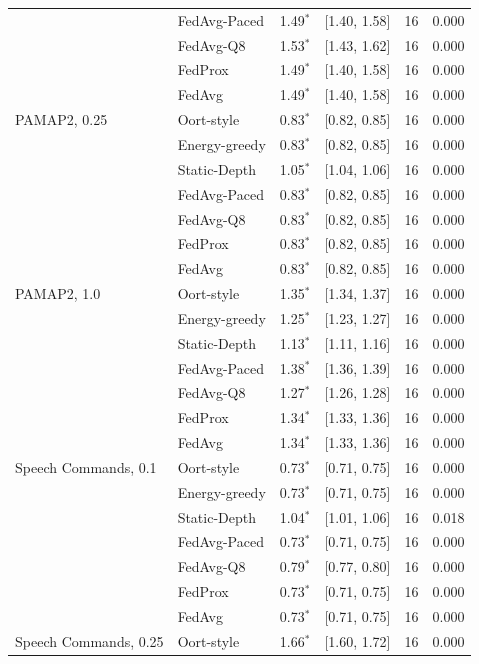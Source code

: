 \begin{tabular}{@{}llrrrr@{}}
 & FedAvg-Paced & 1.49$^{*}$ & [1.40, 1.58] & 16 & 0.000\\
 & FedAvg-Q8 & 1.53$^{*}$ & [1.43, 1.62] & 16 & 0.000\\
 & FedProx & 1.49$^{*}$ & [1.40, 1.58] & 16 & 0.000\\
 & FedAvg & 1.49$^{*}$ & [1.40, 1.58] & 16 & 0.000\\
\midrule
PAMAP2, 0.25 & Oort-style & 0.83$^{*}$ & [0.82, 0.85] & 16 & 0.000\\
 & Energy-greedy & 0.83$^{*}$ & [0.82, 0.85] & 16 & 0.000\\
 & Static-Depth & 1.05$^{*}$ & [1.04, 1.06] & 16 & 0.000\\
 & FedAvg-Paced & 0.83$^{*}$ & [0.82, 0.85] & 16 & 0.000\\
 & FedAvg-Q8 & 0.83$^{*}$ & [0.82, 0.85] & 16 & 0.000\\
 & FedProx & 0.83$^{*}$ & [0.82, 0.85] & 16 & 0.000\\
 & FedAvg & 0.83$^{*}$ & [0.82, 0.85] & 16 & 0.000\\
\midrule
PAMAP2, 1.0 & Oort-style & 1.35$^{*}$ & [1.34, 1.37] & 16 & 0.000\\
 & Energy-greedy & 1.25$^{*}$ & [1.23, 1.27] & 16 & 0.000\\
 & Static-Depth & 1.13$^{*}$ & [1.11, 1.16] & 16 & 0.000\\
 & FedAvg-Paced & 1.38$^{*}$ & [1.36, 1.39] & 16 & 0.000\\
 & FedAvg-Q8 & 1.27$^{*}$ & [1.26, 1.28] & 16 & 0.000\\
 & FedProx & 1.34$^{*}$ & [1.33, 1.36] & 16 & 0.000\\
 & FedAvg & 1.34$^{*}$ & [1.33, 1.36] & 16 & 0.000\\
\midrule
Speech Commands, 0.1 & Oort-style & 0.73$^{*}$ & [0.71, 0.75] & 16 & 0.000\\
 & Energy-greedy & 0.73$^{*}$ & [0.71, 0.75] & 16 & 0.000\\
 & Static-Depth & 1.04$^{*}$ & [1.01, 1.06] & 16 & 0.018\\
 & FedAvg-Paced & 0.73$^{*}$ & [0.71, 0.75] & 16 & 0.000\\
 & FedAvg-Q8 & 0.79$^{*}$ & [0.77, 0.80] & 16 & 0.000\\
 & FedProx & 0.73$^{*}$ & [0.71, 0.75] & 16 & 0.000\\
 & FedAvg & 0.73$^{*}$ & [0.71, 0.75] & 16 & 0.000\\
\midrule
Speech Commands, 0.25 & Oort-style & 1.66$^{*}$ & [1.60, 1.72] & 16 & 0.000\\

\end{tabular}
